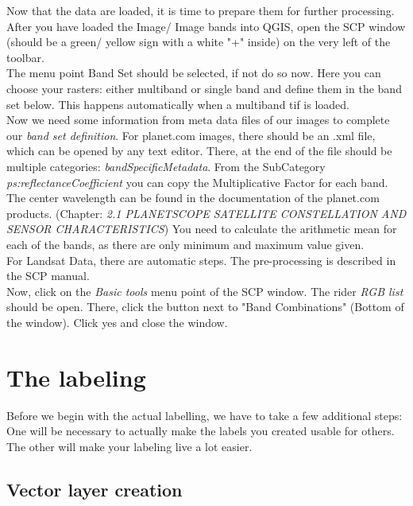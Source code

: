 \documentclass[12pt,a4paper]{scrartcl}
\begin{document}
Now that the data are loaded, it is time to prepare them for further processing.  
After you have loaded the Image/ Image bands into QGIS, open the SCP window (should be a green/ yellow sign with a white "+" inside) on the very left of the toolbar. \\

The menu point Band Set should be selected, if not do so now. 
Here you can choose your rasters: either multiband or single band and define them in the band set below.
This happens automatically when a multiband tif is loaded. \\

Now we need some information from meta data files of our images to complete our \textit{band set definition}.
For planet.com images, there should be an .xml file, which can be opened by any text editor.  
There, at the end of the file should be multiple categories: \textit{bandSpecificMetadata}.  
From the SubCategory \textit{ps:reflectanceCoefficient} you can copy the Multiplicative Factor for each band. \\

The center wavelength can be found in the documentation of the planet.com products. 
(Chapter: \textit{2.1 PLANETSCOPE SATELLITE CONSTELLATION AND SENSOR CHARACTERISTICS})
You need to calculate the arithmetic mean for each of the bands, as there are only minimum and maximum value given. \\

For Landsat Data, there are automatic steps. The pre-processing is described in the SCP manual. \\

Now, click on the \textit{Basic tools} menu point of the SCP window.
The rider \textit{RGB list} should be open. There, click the button next to "Band Combinations" (Bottom of the window). Click yes and close the window.

\section{The labeling}

Before we begin with the actual labelling, we have to take a few additional steps:
One will be necessary to actually make the labels you created usable for others. \\
The other will make your labeling live a lot easier. 

\subsection{Vector layer creation}
\end{document}
